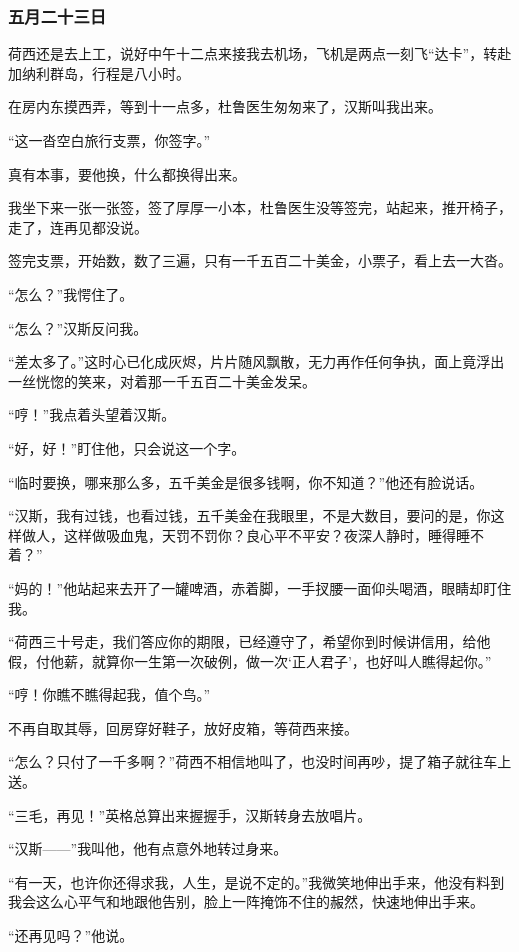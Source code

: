 \subsubsection{五月二十三日}
\par 荷西还是去上工，说好中午十二点来接我去机场，飞机是两点一刻飞“达卡”，转赴加纳利群岛，行程是八小时。
\par 在房内东摸西弄，等到十一点多，杜鲁医生匆匆来了，汉斯叫我出来。
\par “这一沓空白旅行支票，你签字。”
\par 真有本事，要他换，什么都换得出来。
\par 我坐下来一张一张签，签了厚厚一小本，杜鲁医生没等签完，站起来，推开椅子，走了，连再见都没说。
\par 签完支票，开始数，数了三遍，只有一千五百二十美金，小票子，看上去一大沓。
\par “怎么？”我愕住了。
\par “怎么？”汉斯反问我。
\par “差太多了。”这时心已化成灰烬，片片随风飘散，无力再作任何争执，面上竟浮出一丝恍惚的笑来，对着那一千五百二十美金发呆。
\par “哼！”我点着头望着汉斯。
\par “好，好！”盯住他，只会说这一个字。
\par “临时要换，哪来那么多，五千美金是很多钱啊，你不知道？”他还有脸说话。
\par “汉斯，我有过钱，也看过钱，五千美金在我眼里，不是大数目，要问的是，你这样做人，这样做吸血鬼，天罚不罚你？良心平不平安？夜深人静时，睡得睡不着？”
\par “妈的！”他站起来去开了一罐啤酒，赤着脚，一手扠腰一面仰头喝酒，眼睛却盯住我。
\par “荷西三十号走，我们答应你的期限，已经遵守了，希望你到时候讲信用，给他假，付他薪，就算你一生第一次破例，做一次‘正人君子’，也好叫人瞧得起你。”
\par “哼！你瞧不瞧得起我，值个鸟。”
\par 不再自取其辱，回房穿好鞋子，放好皮箱，等荷西来接。
\par “怎么？只付了一千多啊？”荷西不相信地叫了，也没时间再吵，提了箱子就往车上送。
\par “三毛，再见！”英格总算出来握握手，汉斯转身去放唱片。
\par “汉斯——”我叫他，他有点意外地转过身来。
\par “有一天，也许你还得求我，人生，是说不定的。”我微笑地伸出手来，他没有料到我会这么心平气和地跟他告别，脸上一阵掩饰不住的赧然，快速地伸出手来。
\par “还再见吗？”他说。
